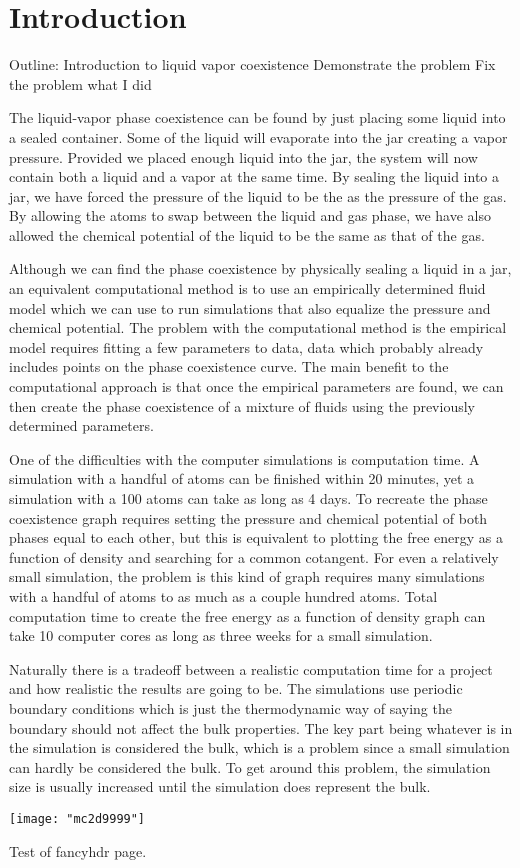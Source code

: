 \section{Introduction}
Outline:
Introduction to liquid vapor coexistence
Demonstrate the problem
Fix the problem
what I did

The liquid-vapor phase coexistence can be found by just placing some liquid into a sealed container. Some of the liquid will evaporate into the jar creating a vapor pressure. Provided we placed enough liquid into the jar, the system will now contain both a liquid and a vapor at the same time. By sealing the liquid into a jar, we have forced the pressure of the liquid to be the as the pressure of the gas. By allowing the atoms to swap between the liquid and gas phase, we have also allowed the chemical potential of the liquid to be the same as that of the gas.

Although we can find the phase coexistence by physically sealing a liquid in a jar, an equivalent computational method is to use an empirically determined fluid model which we can use to run simulations that also equalize the pressure and chemical potential. The problem with the computational method is the empirical model requires fitting a few parameters to data, data which probably already includes points on the phase coexistence curve. The main benefit to the computational approach is that once the empirical parameters are found, we can then create the phase coexistence of a mixture of fluids using the previously determined parameters.

One of the difficulties with the computer simulations is computation time. A simulation with a handful of atoms can be finished within 20 minutes, yet a simulation with a 100 atoms can take as long as 4 days. To recreate the phase coexistence graph requires setting the pressure and chemical potential of both phases equal to each other, but this is equivalent to plotting the free energy as a function of density and searching for a common cotangent. For even a relatively small simulation, the problem is this kind of graph requires many simulations with a handful of atoms to as much as a couple hundred atoms. Total computation time to create the free energy as a function of density graph can take 10 computer cores as long as three weeks for a small simulation.

Naturally there is a tradeoff between a realistic computation time for a project and how realistic the results are going to be. The simulations use periodic boundary conditions which is just the thermodynamic way of saying the boundary should not affect the bulk properties. The key part being whatever is in the simulation is considered the bulk, which is a problem since a small simulation can hardly be considered the bulk. To get around this problem, the simulation size is usually increased until the simulation does represent the bulk.

\texttt{[image: "mc2d9999"]}





\newpage

Test of fancyhdr page.
